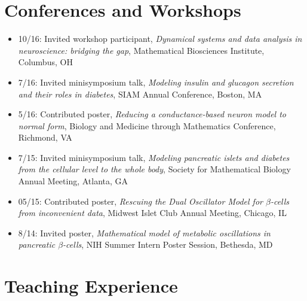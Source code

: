 \documentclass[11pt]{cv}
\begin{document}
\section*{Conferences and Workshops}
\label{sec:orgheadline11}
\begin{itemize}
\item 10/16: Invited workshop participant, \emph{Dynamical systems and data analysis in neuroscience: bridging the gap}, Mathematical Biosciences Institute, Columbus, OH\\
\item 7/16: Invited minisymposium talk, \emph{Modeling insulin and glucagon secretion and their roles in diabetes}, SIAM Annual Conference, Boston, MA\\
\item 5/16: Contributed poster, \emph{Reducing a conductance-based neuron model to normal form}, Biology and Medicine through Mathematics Conference, Richmond, VA\\
\item 7/15: Invited minisymposium talk, \emph{Modeling pancreatic islets and diabetes from the cellular level to the whole body}, Society for Mathematical Biology Annual Meeting, Atlanta, GA\\
\item 05/15: Contributed poster, \emph{Rescuing the Dual Oscillator Model for \(\beta\)-cells from inconvenient data}, Midwest Islet Club Annual Meeting, Chicago, IL\\
\item 8/14: Invited poster, \emph{Mathematical model of metabolic oscillations in pancreatic \(\beta\)-cells}, NIH Summer Intern Poster Session, Bethesda, MD\\
\end{itemize}
\section*{Teaching Experience}
\label{sec:orgheadline16}
\end{document}
